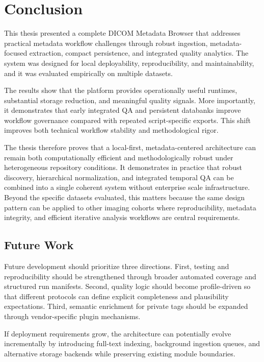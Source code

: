 \chapter{Conclusion}
This thesis presented a complete DICOM Metadata Browser that addresses practical metadata workflow challenges through robust ingestion, metadata-focused extraction, compact persistence, and integrated quality analytics. The system was designed for local deployability, reproducibility, and maintainability, and it was evaluated empirically on multiple datasets.

The results show that the platform provides operationally useful runtimes, substantial storage reduction, and meaningful quality signals. More importantly, it demonstrates that early integrated QA and persistent databanks improve workflow governance compared with repeated script-specific exports. This shift improves both technical workflow stability and methodological rigor.

The thesis therefore proves that a local-first, metadata-centered architecture can remain both computationally efficient and methodologically robust under heterogeneous repository conditions. It demonstrates in practice that robust discovery, hierarchical normalization, and integrated temporal QA can be combined into a single coherent system without enterprise scale infrastructure. Beyond the specific datasets evaluated, this matters because the same design pattern can be applied to other imaging cohorts where reproducibility, metadata integrity, and efficient iterative analysis workflows are central requirements.
\section{Future Work}
Future development should prioritize three directions. First, testing and reproducibility should be strengthened through broader automated coverage and structured run manifests. Second, quality logic should become profile-driven so that different protocols can define explicit completeness and plausibility expectations. Third, semantic enrichment for private tags should be expanded through vendor-specific plugin mechanisms.

If deployment requirements grow, the architecture can potentially evolve incrementally by introducing full-text indexing, background ingestion queues, and alternative storage backends while preserving existing module boundaries.